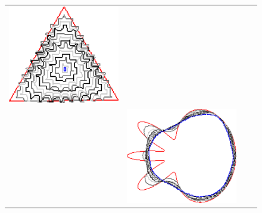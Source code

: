 \begin{figure}
\begin{tabular}{p{2.5em}ccc}
\includegraphics[scale=0.23]{figures/chapter6/radius-effect/triangle/improve/len_pen0.5/radius-9/summary.pdf} \\[2em]
& \includegraphics[scale=0.23]{figures/chapter6/radius-effect/flower/improve/len_pen0.5/radius-3/summary.pdf} &

\end{tabular}
\end{figure}
